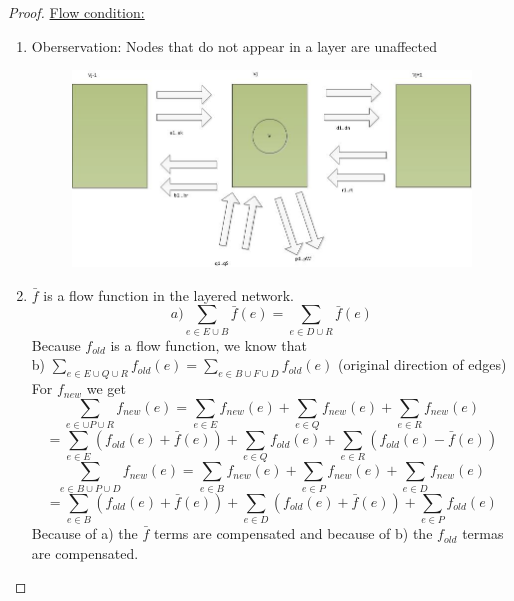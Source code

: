\begin{proof}
\underline{Flow condition:} \\
\begin{enumerate}
\item Oberservation: Nodes that do not appear in a layer are unaffected
\begin{figure}[h!]
\centering
\includegraphics[width=\textwidth]{diagrams/Chapter3_Proof8.jpg} 
\end{figure}
\item $\bar{f}$ is a flow function in the layered network. 
\[ a) \sum_{e \in E \cup B}\bar{f}(e) = \sum_{e \in D \cup R}\bar{f}(e)\]
Because $f_{old}$ is a flow function, we know that \\
b) $\sum_{e \in E \cup Q \cup R}f_{old}(e) = \sum_{e \in B \cup F \cup D}f_{old}(e)$ (original direction of edges) \\
For $f_{new}$ we get 
\[\sum_{e \in  \cup P \cup R} f_{new}(e) = \sum_{e \in E}f_{new}(e) + \sum_{e \in Q}f_{new}(e) + \sum_{e \in R}f_{new}(e)\]
\[= \sum_{e \in E}(f_{old}(e)  + \bar{f}(e)) + \sum_{e \in Q}f_{old}(e) + \sum_{e \in R}(f_{old}(e) - \bar{f}(e))\]
\[\sum_{e \in B \cup P \cup D}f_{new}(e) = \sum_{e \in B}f_{new}(e) + \sum_{e \in P}f_{new}(e) + \sum_{e \in D}f_{new}(e)\]
\[= \sum_{e \in B}(f_{old}(e) + \bar{f}(e)) + \sum_{e \in D}(f_{old}(e) + \bar{f}(e)) + \sum_{e \in P}f_{old}(e)\]
Because of a) the $\bar{f}$ terms are compensated and because of b) the $f_{old}$ termas are compensated.
\end{enumerate}
\end{proof}